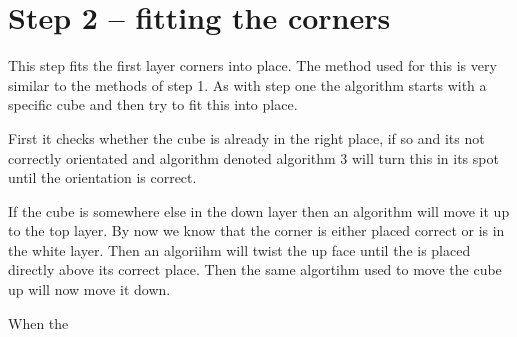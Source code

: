 \section{Step 2 -- fitting the corners}
This step fits the first layer corners into place. The method used for this is very similar to the methods of step 1. As with step one the algorithm starts with a specific cube and then try to fit this into place.  

First it checks whether the cube is already in the right place, if so and its not correctly orientated and algorithm denoted algorithm 3 will turn this \cpiece{} in its spot until the orientation is correct. 

If the cube is somewhere else in the down layer then an algorithm will move it up to the top layer. By now we know that the corner \cpiece{} is either placed correct or is in the white layer. Then an algoriihm will twist the up face until the \cpiece{} is placed directly above its correct place. Then the same algortihm used to move the cube up will now move it down. 

When the \cpiece{} 
